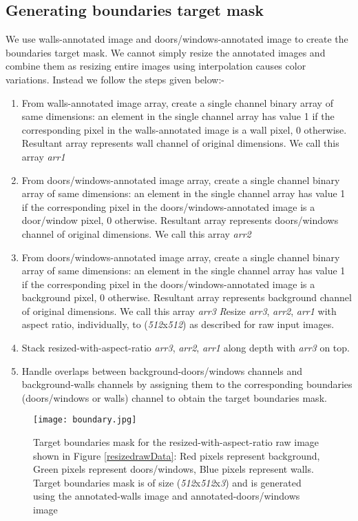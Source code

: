 \documentclass[a4paper]{article}
\begin{document}
\subsection{Generating boundaries target mask}
We use walls-annotated image and doors/windows-annotated image to create the boundaries target mask. We cannot simply resize the annotated images and combine them as resizing entire images using interpolation causes color variations. Instead we follow the steps given below:-
\begin{enumerate}
    \item From walls-annotated image array, create a single channel binary array of same dimensions: an element in the single channel array has value 1 if the corresponding pixel in the walls-annotated image is a wall pixel, 0 otherwise. Resultant array represents wall channel of original dimensions. We call this array \textit{arr1}
    \item From doors/windows-annotated image array, create a single channel binary array of same dimensions: an element in the single channel array has value 1 if the corresponding pixel in the doors/windows-annotated image is a door/window pixel, 0 otherwise. Resultant array represents doors/windows channel of original dimensions. We call this array \textit{arr2}
    \item From doors/windows-annotated image array, create a single channel binary array of same dimensions: an element in the single channel array has value 1 if the corresponding pixel in the doors/windows-annotated image is a background pixel, 0 otherwise. Resultant array represents background channel of original dimensions. We call this array \textit{arr3}
    \textit Resize \textit{arr3}, \textit{arr2}, \textit{arr1} with aspect ratio, individually, to (\textit{512}x\textit{512}) as described for raw input images.
    \item Stack resized-with-aspect-ratio \textit{arr3}, \textit{arr2}, \textit{arr1} along depth with \textit{arr3} on top.
    \item Handle overlaps between background-doors/windows channels and background-walls channels by assigning them to the corresponding boundaries (doors/windows or walls) channel to obtain the target boundaries mask.
\end{enumerate}
\begin{figure}[H]
    \centering
    \texttt{[image: boundary.jpg]}
    \caption{Target boundaries mask for the resized-with-aspect-ratio raw image shown in Figure \ref{resizedrawData}: Red pixels represent background, Green pixels represent doors/windows, Blue pixels represent walls. Target boundaries mask is of size (\textit{512}x\textit{512}x\textit{3}) and is generated using the annotated-walls image and annotated-doors/windows image}
    \label{boundary}
\end{figure}
\end{document}
